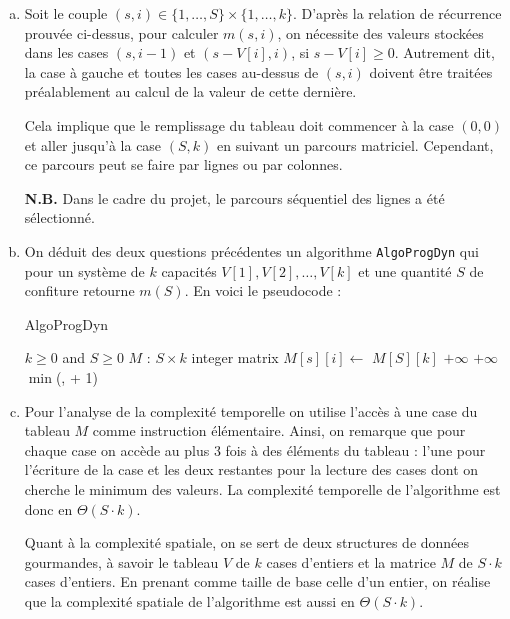 \documentclass[12pt,a4paper]{article}
\begin{document}
\begin{enumerate}[a)]
 \item Soit le couple $(s,i) \in \{1,\dotsc,S\} \times \{1,\dotsc,k\}$. D'apr\`es la relation de r\'ecurrence prouv\'ee ci-dessus, pour calculer $m(s,i)$, on n\'ecessite des valeurs stock\'ees dans les cases $(s,i-1)$ et $(s-V[i],i)$, si $s-V[i] \geq 0$. Autrement dit, la case \`a gauche et toutes les cases au-dessus de $(s,i)$ doivent \^etre trait\'ees pr\'ealablement au calcul de la valeur de cette derni\`ere.
 
 Cela implique que le remplissage du tableau doit commencer \`a la case $(0,0)$ et aller jusqu'\`a la case $(S,k)$ en suivant un parcours matriciel. Cependant, ce parcours peut se faire par lignes ou par colonnes. 
 
 {\bfseries N.B.} Dans le cadre du projet, le parcours s\'equentiel des lignes a \'et\'e s\'electionn\'e.
 
 \item On d\'eduit des deux questions pr\'ec\'edentes un algorithme \texttt{AlgoProgDyn} qui pour un syst\`eme de $k$ capacit\'es $V[1],V[2],\dotsc,V[k]$ et une quantit\'e $S$ de confiture retourne $m(S)$. En voici le pseudocode :
 
\begin{algorithm}
\caption{AlgoProgDyn}
\begin{algorithmic}[1]
\Require $k \geq 0$ and $S \geq 0$
    \State $M$ : $S \times k$ integer matrix
            \State $M[s][i] \gets $ 
        \EndFor
    \EndFor
    \State \Return $M[S][k]$
\EndFunction
\Statex
{}
        \State {}
        \State \Return $+\infty$
        \State \Return $+\infty$
    \Else 
        \State \Return $\min$(,  + 1)
    \EndIf
\EndFunction
\end{algorithmic}
\end{algorithm}

 \item Pour l'analyse de la complexit\'e temporelle on utilise l'acc\`es \`a une case du tableau $M$ comme instruction \'el\'ementaire. Ainsi, on remarque que pour chaque case on acc\`ede au plus 3 fois \`a des \'el\'ements du tableau : l'une pour l'\'ecriture de la case et les deux restantes pour la lecture des cases dont on cherche le minimum des valeurs.
La complexit\'e temporelle de l'algorithme est donc en $\Theta(S\cdot k)$.

Quant \`a la complexit\'e spatiale, on se sert de deux structures de donn\'ees gourmandes, \`a savoir le tableau $V$ de $k$ cases d'entiers et la matrice $M$ de $S\cdot k$ cases d'entiers. En prenant comme taille de base celle d'un entier, on r\'ealise que la complexit\'e spatiale de l'algorithme est aussi en $\Theta(S\cdot k)$.
\end{enumerate}
\end{document}

